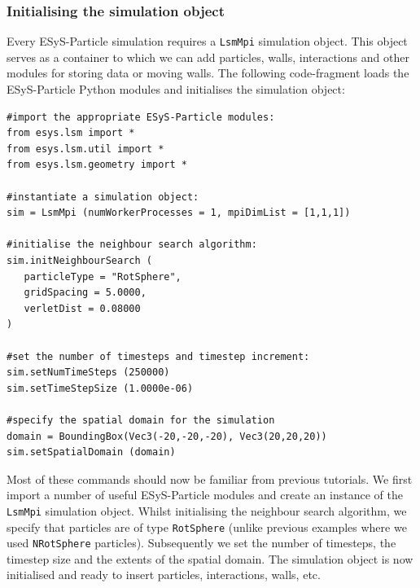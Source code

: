 
\subsubsection{Initialising the simulation object}

Every ESyS-Particle simulation requires a \texttt{LsmMpi} simulation object. This object serves as a container to which we can add particles, walls, interactions and other modules for storing data or moving walls. The following code-fragment loads the ESyS-Particle Python modules and initialises the simulation object:

\begin{verbatim}
#import the appropriate ESyS-Particle modules:
from esys.lsm import *
from esys.lsm.util import *
from esys.lsm.geometry import *

#instantiate a simulation object:
sim = LsmMpi (numWorkerProcesses = 1, mpiDimList = [1,1,1])

#initialise the neighbour search algorithm:
sim.initNeighbourSearch (
   particleType = "RotSphere",
   gridSpacing = 5.0000,
   verletDist = 0.08000
)

#set the number of timesteps and timestep increment:
sim.setNumTimeSteps (250000)
sim.setTimeStepSize (1.0000e-06)

#specify the spatial domain for the simulation
domain = BoundingBox(Vec3(-20,-20,-20), Vec3(20,20,20))
sim.setSpatialDomain (domain)
\end{verbatim}

\noindent
Most of these commands should now be familiar from previous tutorials. We first import a number of useful ESyS-Particle modules and create an instance of the \texttt{LsmMpi} simulation object. Whilst initialising the neighbour search algorithm, we specify that particles are of type \texttt{RotSphere} (unlike previous examples where we used \texttt{NRotSphere} particles). Subsequently we set the number of timesteps, the timestep size and the extents of the spatial domain. The simulation object is now initialised and ready to insert particles, interactions, walls, etc.

